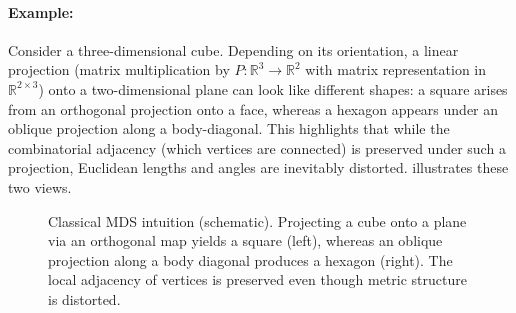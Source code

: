 \paragraph{Example:} Consider a three-dimensional cube. Depending on its orientation, a linear projection (matrix multiplication by \(P: \mathbb{R}^3 \rightarrow \mathbb{R}^2\) with matrix representation in \(\mathbb{R}^{2 \times 3}\)) onto a two-dimensional plane can look like different shapes: a square arises from an orthogonal projection onto a face, whereas a hexagon appears under an oblique projection along a body-diagonal. This highlights that while the combinatorial adjacency (which vertices are connected) is preserved under such a projection, Euclidean lengths and angles are inevitably distorted.  illustrates these two views.

\begin{figure}[t]
    \centering
    \caption{Classical MDS intuition (schematic). Projecting a cube onto a plane via an orthogonal map yields a square (left), whereas an oblique projection along a body diagonal produces a hexagon (right). The local adjacency of vertices is preserved even though metric structure is distorted.}
    \label{fig:lec5-mds-projection}
\end{figure}


